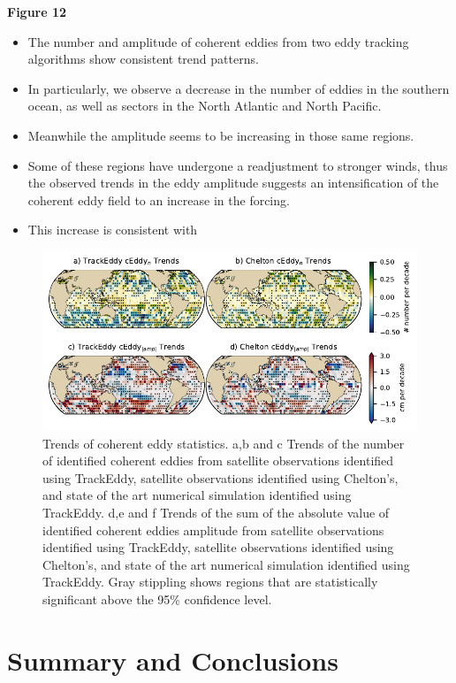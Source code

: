 \documentclass[draft,linenumbers]{agujournal2019}
\begin{document}
	\textbf{Figure 12}
	\begin{itemize}
		\item The number and amplitude of coherent eddies from two eddy tracking algorithms show consistent trend patterns. 
		\item In particularly, we observe a decrease in the number of eddies in the southern ocean, as well as sectors in the North Atlantic and North Pacific. 
		\item Meanwhile the amplitude seems to be increasing in those same regions. 
		\item Some of these regions have undergone a readjustment to stronger winds, thus the observed trends in the eddy amplitude suggests an intensification of the coherent eddy field to an increase in the forcing.
		\item This increase is consistent with \citet{Martinez_Kinetic_2021}
	\end{itemize}

	\begin{figure}
	    \centering
	    \includegraphics[width=1\textwidth]{figures/all_trackeddy_trends.pdf}
	    \caption{Trends of coherent eddy statistics. a,b and c Trends of the number of identified coherent eddies from satellite observations identified using TrackEddy, satellite observations identified using Chelton's, and state of the art numerical simulation identified using TrackEddy. d,e and f Trends of the sum of the absolute value of identified coherent eddies amplitude from satellite observations identified using TrackEddy, satellite observations identified using Chelton's, and state of the art numerical simulation identified using TrackEddy. Gray stippling shows regions that are statistically significant above the 95\% confidence level.
		}
	    \label{fig:eddy_stats_trends}
	\end{figure}
	
	\section{Summary and Conclusions}	
	
	\acknowledgments
	
	
	
\end{document}
